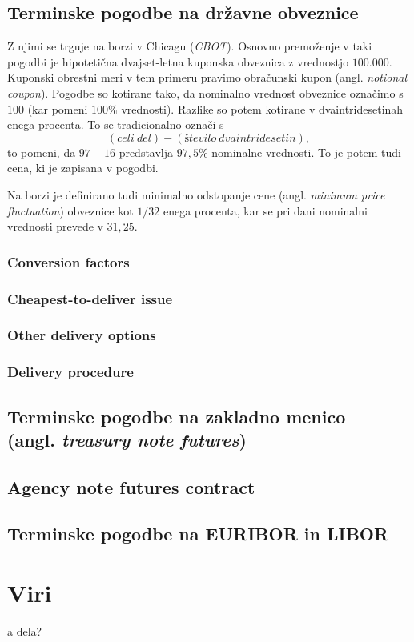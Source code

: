 \documentclass[a4paper, 12pt]{article}
\begin{document}
\subsection{Terminske pogodbe na državne obveznice}
Z njimi se trguje na borzi v Chicagu (\textit{CBOT}). Osnovno premoženje v taki pogodbi je hipotetična
dvajset-letna kuponska obveznica z vrednostjo \textdollar$100.000$. Kuponski obrestni meri v tem primeru
pravimo obračunski kupon (angl. \textit{notional coupon}). Pogodbe so kotirane tako, da nominalno vrednost
obveznice označimo s $100$ (kar pomeni $100\%$ vrednosti). Razlike so potem kotirane v 
dvaintridesetinah enega procenta. To se tradicionalno označi s 
%
$$ (celi\:del)-(število\:dvaintridesetin), $$
%
to pomeni, da $97-16$ predstavlja $97,5\%$ nominalne vrednosti. To je potem tudi cena, ki je zapisana v 
pogodbi.

Na borzi je definirano tudi minimalno odstopanje cene (angl. \textit{minimum price fluctuation}) obveznice
kot $1/32$ enega procenta, kar se pri dani nominalni vrednosti prevede v \textdollar$31,25.$

\subsubsection{Conversion factors}
\subsubsection{Cheapest-to-deliver issue}
\subsubsection{Other delivery options}
\subsubsection{Delivery procedure}

\subsection{Terminske pogodbe na zakladno menico \\ (angl. \textit{treasury note futures})}
\subsection{Agency note futures contract}
\subsection{Terminske pogodbe na EURIBOR in LIBOR}

\section{Viri}
\begin{description}
    \item a dela?
\end{description}
\end{document}
